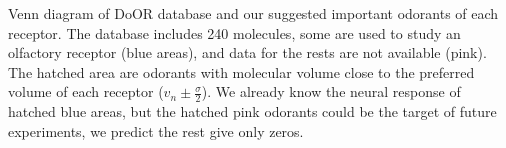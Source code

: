 \documentclass[a1paper,fontscale=0.6]{baposter} %
\newcommand{\numberofreceptors}{ 28 }
\newcommand{\bonferroni}{ 11 }
\newcommand{\fdr}{ 26 }
\newcommand{\nocorrection}{ 2 }
\begin{document}
\begin{poster}
{\begin{center}
\end{center}	
Venn diagram of DoOR database and our suggested important odorants of each receptor.
The database includes 240 molecules, 
some are used to study an olfactory receptor (blue areas), 
and data for the rests are not available (pink).
The hatched area are odorants with molecular volume close to the preferred volume of each receptor
($v_n \pm \frac{\sigma}{2}$).
We already know the neural response of hatched blue areas, 
but the hatched pink odorants could be the target of future experiments, we predict the rest give only zeros.






}
\end{poster}
\end{document}
